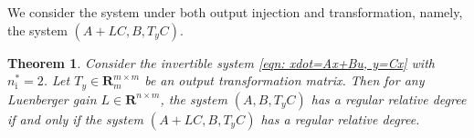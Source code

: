 \documentclass[sort&compress]{elsarticle}
\newtheorem{theorem}{Theorem}
\newcommand\nsharp{n_\mathrm i^*}
\newcommand\rank{\mathrm{rank}}
\newcommand\R{\mathbf R}
\begin{document}

We consider the system under both output injection and transformation, namely, the system $(A+LC,B,T_yC)$.

\begin{theorem}
\label{thm: (A,B,TyC) and (A+LC,B,TyC), Ty the same}
Consider the invertible system \eqref{eqn: xdot=Ax+Bu, y=Cx}
with $\nsharp=2$.
Let $T_y\in\R^{m\times m}_m$ be an output transformation matrix.
Then for any Luenberger gain $L\in\R^{n\times m}$,
the system $(A,B,T_yC)$ has a regular relative degree
if and only if
the system $(A+LC,B,T_yC)$ has a regular relative degree.
\end{theorem}
\end{document}

